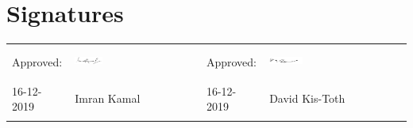 \section*{Signatures}


\begin{table}[H]
\begin{tabular}{lllll}
Approved:  & \includegraphics[width=0.25\textwidth, height=10mm]{pictures/general/Imran.PNG} &  & Approved:  & \includegraphics[width=0.25\textwidth, height=10mm]{pictures/general/david.PNG} \\ \cline{2-2} \cline{5-5} 
16-12-2019 & Imran Kamal&  & 16-12-2019 & David Kis-Toth \\
           &                          &  &            &                \\
     
\end{tabular}
\end{table}